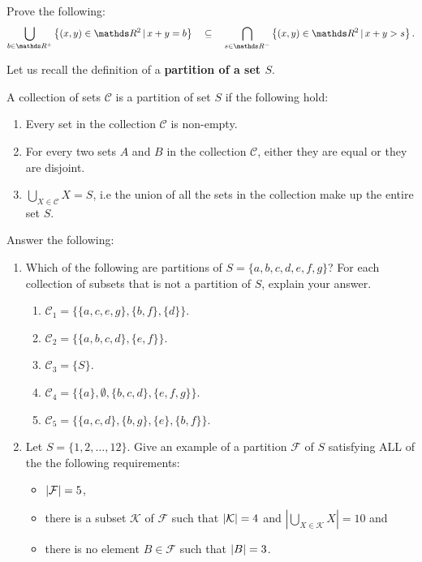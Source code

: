 \documentclass[11pt]{article}
\newcounter{Quesnumb}  %
\newcommand{\problemnum}{%
            \addtocounter{Quesnumb}{1}%
            \arabic{Quesnumb}}
\begin{document}
\begin{problem}{\problemnum}
Prove the following:
\[\bigcup_{b \in \bbR^{+}} \left\{(x,y) \in \bbR^2 \, | \, x+y=b\right\} \quad \subseteq \quad \bigcap_{s \in \bbR^{-}} \left\{(x,y) \in \bbR^2 \, | \, x+y>s\right\}.\]
\end{problem}

\begin{problem}{\problemnum}
\begin{tcolorbox}[colback=red!10!white, colframe=red!50!blue, title=Partition of a set, center title]
Let us recall the definition of a \textbf{partition of a set $S$}.
    \begin{define}
        \label{def:1}
        A collection of sets $\mathcal{C}$ is a partition of set $S$ if the following hold:
            \begin{enumerate}
                \item Every set in the collection $\mathcal{C}$ is non-empty.
                \item For every two sets $A$ and $B$ in the collection $\mathcal{C}$, either they are equal or they are disjoint.
                \item $\displaystyle \bigcup_{X \in \mathcal{C}} X = S$, i.e the union of all the sets in the collection make up the entire set $S$.
            \end{enumerate}
    \end{define}
    \end{tcolorbox}
    Answer the following:
    \begin{enumerate}[label=\alph*).]
    \item Which of the following are partitions of $S=\{a,b,c,d,e,f,g\}$? For each collection of subsets that is not a partition of $S$, explain your answer.
        \begin{enumerate}[label=\roman*).]
            \item $\mathcal{C}_1=\{\{a,c,e,g\}, \{b,f\}, \{d\}\}$.
            \item $\mathcal{C}_2=\{\{a,b,c,d\}, \{e,f\}\}$.
            \item $\mathcal{C}_3=\{S\}$.
            \item $\mathcal{C}_4=\{\{a\}, \emptyset, \{b,c,d\}, \{e,f,g\}\}$.
            \item $\mathcal{C}_5=\{\{a,c,d\}, \{b,g\}, \{e\}, \{b,f\}\}$.
        \end{enumerate}
    \item Let $S = \{1, 2, \ldots , 12\}$. Give an example of a partition $\mathcal{F}$ of $S$ satisfying ALL of the the following requirements:
    \begin{itemize}
    \item $\lvert \mathcal{F} \rvert = 5$,
    \item there is a subset $\mathcal{K}$ of $\mathcal{F}$ such that $\lvert \mathcal{K} \rvert = 4$ and $\left|\bigcup_{X \in \mathcal{K}}X\right| = 10$ and
    \item there is no element $B \in  \mathcal{F}$ such that $\lvert B \rvert = 3$.
    \end{itemize}
\end{enumerate}
\end{problem}
\end{document}

